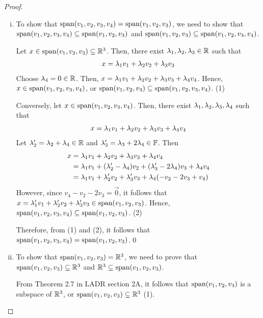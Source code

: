 \renewcommand{\qedsymbol}{$ $}
\begin{proof}
    \begin{enumerate}[(i)]
        \renewcommand{\qedsymbol}{$\blacksquare$}
        \item To show that $\textnormal{span}(v_1,v_2,v_3,v_4)=\textnormal{span}(v_1,v_2,v_3)$, we need to show that\\ $\textnormal{span}(v_1,v_2,v_3,v_4)\subseteq\textnormal{span}(v_1,v_2,v_3)$ and $\textnormal{span}(v_1,v_2,v_3)\subseteq\textnormal{span}(v_1,v_2,v_3,v_4)$.
        
        Let $x\in\textnormal{span}(v_1,v_2,v_3)\subseteq\mathbb R^3$. Then, there exist $\lambda_1,\lambda_2,\lambda_3\in\mathbb R$ such that
        \[
            \begin{aligned}
                x=\lambda_1v_1+\lambda_2v_2+\lambda_3v_3
            \end{aligned}    
        \]
        Choose $\lambda_4=0\in\mathbb R$. Then, $x=\lambda_1v_1+\lambda_2v_2+\lambda_3v_3+\lambda_4v_4$. Hence, $x\in\textnormal{span}(v_1,v_2,v_3,v_4)$, or $\textnormal{span}(v_1,v_2,v_3)\subseteq\textnormal{span}(v_1,v_2,v_3,v_4)$. (1)
        
        Conversely, let $x\in\textnormal{span}(v_1,v_2,v_3,v_4)$. Then, there exist $\lambda_1,\lambda_2,\lambda_3,\lambda_4$ such that
        \[
            \begin{aligned}
                x=\lambda_1v_1+\lambda_2v_2+\lambda_3v_3+\lambda_4v_4
            \end{aligned}
        \]  
        Let $\lambda_2'=\lambda_2+\lambda_4\in\mathbb R$ and $\lambda_3'=\lambda_3+2\lambda_4\in\mathbb F$. Then
        \[
            \begin{aligned}
                x &= \lambda_1v_1+\lambda_2v_2+\lambda_3v_3+\lambda_4v_4\\
                  &= \lambda_1v_1+(\lambda_2'-\lambda_4)v_2+(\lambda_3'-2\lambda_4)v_3+\lambda_4v_4\\
                  &= \lambda_1v_1+\lambda_2'v_2+\lambda_3'v_3+\lambda_4(-v_2-2v_3+v_4)
            \end{aligned}  
        \]
        However, since $v_4-v_2-2v_3=\vec{0}$, it follows that $x=\lambda_1'v_1+\lambda_2'v_2+\lambda_3'v_3\in\textnormal{span}(v_1,v_2,v_3)$. Hence, $\textnormal{span}(v_1,v_2,v_3,v_4)\subseteq\textnormal{span}(v_1,v_2,v_3)$. (2)

        Therefore, from (1) and (2), it follows that $\textnormal{span}(v_1,v_2,v_3,v_4)=\textnormal{span}(v_1,v_2,v_3)$.\qed
        \item To show that $\textnormal{span}(v_1,v_2,v_3)=\mathbb R^3$, we need to prove that $\textnormal{span}(v_1,v_2,v_3)\subseteq\mathbb R^3$ and $\mathbb R^3\subseteq\textnormal{span}(v_1,v_2,v_3)$.

        From Theorem 2.7 in LADR section 2A, it follows that $\textnormal{span}(v_1,v_2,v_3)$ is a subspace of $\mathbb R^3$, or $\textnormal{span}(v_1,v_2,v_3)\subseteq\mathbb R^3$ (1).


\end{enumerate}
\end{proof}
